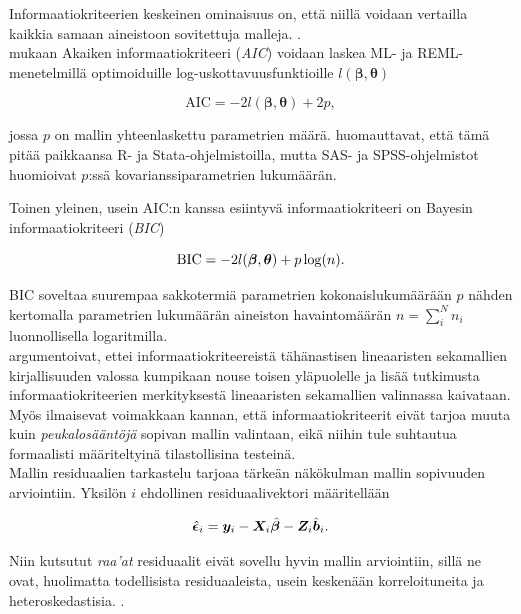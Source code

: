\documentclass[finnish]{docopts}
\begin{document}
 Informaatiokriteerien keskeinen ominaisuus on, että niillä voidaan vertailla kaikkia samaan aineistoon sovitettuja malleja. \citep{west14}.\\
 
 \cite{west14} mukaan Akaiken informaatiokriteeri (\textit{AIC}) voidaan laskea ML- ja REML-menetelmillä optimoiduille log-uskottavuusfunktioille $l(\bm{\beta}, \bm{\theta})$
 
 $$
 \text{AIC} = -2l(\bm{\beta}, \bm{\theta})+2p,
 $$
 
 jossa $p$ on mallin yhteenlaskettu parametrien määrä. \cite{west14} huomauttavat, että tämä pitää paikkaansa R- ja Stata-ohjelmistoilla, mutta SAS- ja SPSS-ohjelmistot huomioivat $p$:ssä kovarianssiparametrien lukumäärän.
 
 Toinen yleinen, usein AIC:n kanssa esiintyvä informaatiokriteeri on Bayesin informaatiokriteeri (\textit{BIC})
 
 $$
 \text{BIC} = -2l(\bm{\beta}, \bm{\theta})+p\log(n).\\
 $$
 
 BIC soveltaa suurempaa sakkotermiä parametrien kokonaislukumäärään $p$ nähden kertomalla parametrien lukumäärän aineiston havaintomäärän $n = \sum\limits_{i}^N n_i$ luonnollisella logaritmilla.\\
 
 \cite{west14} argumentoivat, ettei informaatiokriteereistä tähänastisen lineaaristen sekamallien kirjallisuuden valossa kumpikaan nouse toisen yläpuolelle ja lisää tutkimusta informaatiokriteerien merkityksestä lineaaristen sekamallien valinnassa kaivataan.\\
 
 Myös \cite{verbeke00} ilmaisevat voimakkaan kannan, että informaatiokriteerit eivät tarjoa muuta kuin \textit{peukalosääntöjä} sopivan mallin valintaan, eikä niihin tule suhtautua formaalisti määriteltyinä tilastollisina testeinä. \\
 
 Mallin residuaalien tarkastelu tarjoaa tärkeän näkökulman mallin sopivuuden arviointiin. Yksilön $i$ ehdollinen residuaalivektori määritellään
 
 $$
\hat{\bm{\epsilon}}_i = \bm{y}_i - \bm{X}_i \hat{\bm{\beta}} - \bm{Z}_i \hat{\bm{b}}_i. \\
 $$
 
 Niin kutsutut \textit{raa'at} residuaalit eivät sovellu hyvin mallin arviointiin, sillä ne ovat, huolimatta todellisista residuaaleista, usein keskenään korreloituneita ja heteroskedastisia. \citep{west14}.\\
 
\end{document}
